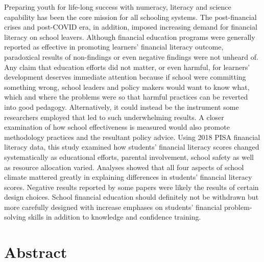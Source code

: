 \documentclass[a4paper,11pt,UKenglish,twoside,openright]{report}\usepackage[]{graphicx}\usepackage[]{color}
\begin{document}
\noindent Preparing youth for life-long success with numeracy, literacy and science capability has been the core mission for all schooling systems. The post-financial crises and post-COVID era, in addition, imposed increasing demand for financial literacy on school leavers. Although financial education programs were generally reported as effective in promoting learners' financial literacy outcome, paradoxical results of non-findings or even negative findings were not unheard of. Any claim that education efforts did not matter, or even harmful, for learners' development deserves immediate attention because if school were committing something wrong, school leaders and policy makers would want to know what, which and where the problems were so that harmful practices can be reverted into good pedagogy. Alternatively, it could instead be the instrument some researchers employed that led to such underwhelming results. A closer examination of how school effectiveness is measured would also promote methodology practices and the resultant policy advice. Using 2018 PISA financial literacy data, this study examined how students' financial literacy scores changed systematically as educational efforts, parental involvement, school safety as well as resource allocation varied. Analyses showed that all four aspects of school climate mattered greatly in explaining differences in students' financial literacy scores. Negative results reported by some papers were likely the results of certain design choices. School financial education should definitely not be withdrawn but more carefully designed with increase emphases on students' financial problem-solving skills in addition to knowledge and confidence training.
\setcounter{page}{7}


\chapter*{Abstract}
\label{Ab.1}
\end{document}
